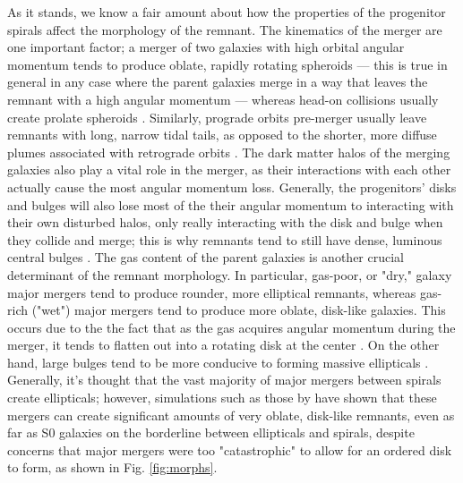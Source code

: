 \documentclass[linenumbers]{aastex631}
\begin{document}
As it stands, we know a fair amount about how the properties of the progenitor spirals affect the morphology of the remnant.
The kinematics of the merger are one important factor; a merger of two galaxies with high orbital angular momentum tends to produce oblate, rapidly rotating spheroids --- this is true in general in any case where the parent galaxies merge in a way that leaves the remnant with a high angular momentum --- whereas head-on collisions usually create prolate spheroids \citep{Barnes+1992}. 
Similarly, prograde orbits pre-merger usually leave remnants with long, narrow tidal tails, as opposed to the shorter, more diffuse plumes associated with retrograde orbits \citep{Duc2013}. 
The dark matter halos of the merging galaxies also play a vital role in the merger, as their interactions with each other actually cause the most angular momentum loss. 
Generally, the progenitors' disks and bulges will also lose most of the their angular momentum to interacting with their own disturbed halos, only really interacting with the disk and bulge when they collide and merge; this is why remnants tend to still have dense, luminous central bulges \citep{Barnes+1992}.
The gas content of the parent galaxies is another crucial determinant of the remnant morphology.
In particular, gas-poor, or "dry," galaxy major mergers tend to produce rounder, more elliptical remnants, whereas gas-rich ("wet") major mergers tend to produce more oblate, disk-like galaxies.
This occurs due to the the fact that as the gas acquires angular momentum during the merger, it tends to flatten out into a rotating disk at the center \citep{Eliche-Moral+2018}.
On the other hand, large bulges tend to be more conducive to forming massive ellipticals \citep{Barnes+1992}.
Generally, it's thought that the vast majority of major mergers between spirals create ellipticals; however, simulations such as those by \cite{Eliche-Moral+2018} have shown that these mergers can create significant amounts of very oblate, disk-like remnants, even as far as S0 galaxies on the borderline between ellipticals and spirals, despite concerns that major mergers were too "catastrophic" to allow for an ordered disk to form, as shown in Fig. \ref{fig:morphs}.
\end{document}
